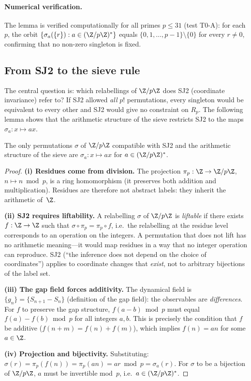 \documentclass[12pt,a4paper]{article}
\begin{document}
\paragraph{Numerical verification.}
The lemma is verified computationally for all primes $p \leq 31$
(test T0-A): for each $p$, the orbit
$\{\sigma_a(\{r\}) : a \in (\Z/p\Z)^*\}$ equals $\{0, 1, \ldots, p-1\}
\setminus \{0\}$ for every $r \neq 0$, confirming that no non-zero
singleton is fixed.

\subsection{From SJ2 to the sieve rule}
\label{sec:ch25_sj2_sieve}

The central question is: which relabellings of $\Z/p\Z$ does
SJ2 (coordinate invariance) refer to?  If SJ2 allowed \emph{all}
$p!$ permutations, every singleton would be equivalent to every
other and SJ2 would give no constraint on $R_p$.  The following
lemma shows that the arithmetic structure of the sieve restricts
SJ2 to the maps $\sigma_a : x \mapsto ax$.

\begin{lemma}
\label{lem:lifting_forces_sigma_a}
The only permutations $\sigma$ of $\Z/p\Z$ compatible with SJ2
and the arithmetic structure of the sieve are $\sigma_a : x
\mapsto ax$ for $a \in (\Z/p\Z)^*$.
\end{lemma}

\begin{proof}
\textbf{(i) Residues come from division.}
The projection $\pi_p : \Z \to \Z/p\Z$, $n \mapsto n \bmod p$,
is a ring homomorphism (it preserves both addition and multiplication).
Residues are therefore not abstract labels: they inherit the
arithmetic of~$\Z$.

\textbf{(ii) SJ2 requires liftability.}
A relabelling $\sigma$ of $\Z/p\Z$ is \emph{liftable} if there
exists $f : \Z \to \Z$ such that $\sigma \circ \pi_p = \pi_p \circ f$,
i.e.\ the relabelling at the residue level corresponds to an
operation on the integers.  A permutation that does not lift has
no arithmetic meaning---it would map residues in a way that no
integer operation can reproduce.  SJ2 (``the inference does not
depend on the choice of coordinates'') applies to coordinate
changes that \emph{exist}, not to arbitrary bijections of the
label set.

\textbf{(iii) The gap field forces additivity.}
The dynamical field is $\{g_n\} = \{S_{n+1} - S_n\}$ (definition of the gap field):
the observables are \emph{differences}.  For $f$ to preserve the
gap structure, $f(a - b) \bmod p$ must equal
$f(a) - f(b) \bmod p$ for all integers $a, b$.
This is precisely the condition that $f$ be additive
($f(n + m) = f(n) + f(m)$), which implies $f(n) = an$ for
some $a \in \Z$.

\textbf{(iv) Projection and bijectivity.}
Substituting: $\sigma(r) = \pi_p(f(n)) = \pi_p(an) = ar \bmod p
= \sigma_a(r)$.  For $\sigma$ to be a bijection of $\Z/p\Z$,
$a$ must be invertible mod~$p$, i.e.\ $a \in (\Z/p\Z)^*$.
\end{proof}
\end{document}
